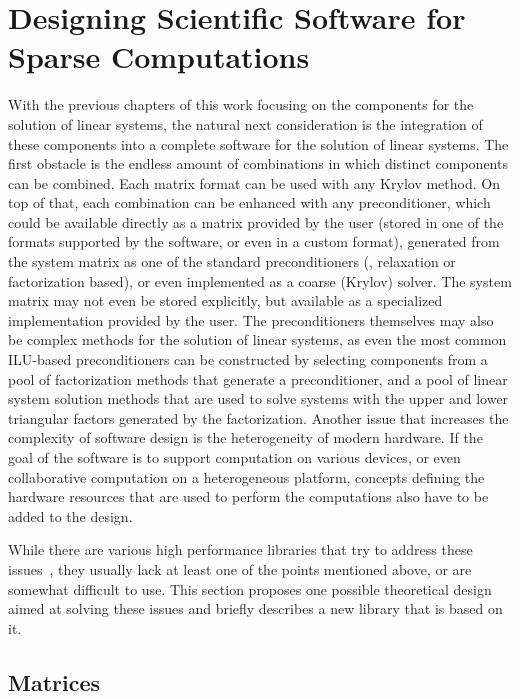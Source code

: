 \section{Designing Scientific Software for Sparse Computations}

With the previous chapters of this work focusing on the components for the
solution of linear systems, the natural next consideration is the integration of
these components into a complete software for the solution of linear systems.
The first obstacle is the endless amount of combinations in which distinct
components can be combined. Each matrix format can be used with any Krylov
method. On top of that, each combination can be enhanced with any
preconditioner, which could be available directly as a matrix provided by the
user (stored in one of the formats supported by the software, or even in a
custom format), generated from the system matrix as one of the standard
preconditioners (\eg, relaxation or factorization based), or even implemented as
a coarse (Krylov) solver. The system matrix may not even be stored explicitly,
but available as a specialized implementation provided by the user. The
preconditioners themselves may also be complex methods for the solution of
linear systems, as even the most common ILU-based preconditioners can be
constructed by selecting components from a pool of factorization methods that
generate a preconditioner, and a pool of linear system solution methods that are
used to solve systems with the upper and lower triangular factors generated by
the factorization. Another issue that increases the complexity of software
design is the heterogeneity of modern hardware. If the goal of the software is
to support computation on various devices, or even collaborative computation on
a heterogeneous platform, concepts defining the hardware resources that are used
to perform the computations also have to be added to the design.

While there are various high performance libraries that try to address these
issues~\cite{magma,vienna-cl,paralution}, they usually lack at least one of the
points mentioned above, or are somewhat difficult to use. This section proposes
one possible theoretical design aimed at solving these issues and briefly
describes a new library that is based on it.

\subsection{Matrices}

